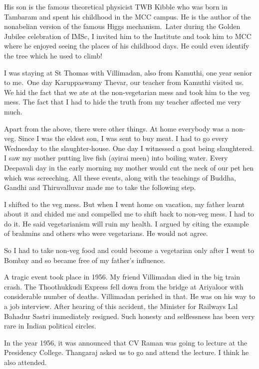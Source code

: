  
His son is the famous theoretical physicist TWB Kibble	who was born in 
Tambaram and spent his childhood in the MCC campus. He is the author of 
the nonabelian version of the famous Higgs mechanism.\ Later during the 
Golden Jubilee celebration of IMSc, I invited him to the Institute and 
took him to MCC where he enjoyed seeing the places of his childhood 
days. He could even identify the tree which he used to climb!

  
I was staying at St Thomas with Villimadan, also from Kamuthi, one year 
senior to me.\ One day Karuppaswamy Thevar, our teacher from Kamuthi 
visited us. We hid the fact that we ate at the non-vegetarian mess and 
took him to the veg mess. The fact that I had to hide the truth from my 
teacher affect\-ed me very much.


Apart from the above, there were other things. At home every\-body was a 
non-veg. Since I was the eldest son, I was sent to buy meat. I had to go 
every Wednesday to the slaughter-house. One day I witnessed a goat being 
slaughtered. I saw my mother putting live fish (ayirai meen) into 
boiling water. Every Deepa\-vali day in the early morning my mother would 
cut the neck of our pet hen which was screeching. All these events, 
along with the teachings of Buddha, Gandhi and Thiruvalluvar made me to 
take the following step.

\vskip 1pt
I shifted to the veg mess. But when I went home on vacation, my father 
learnt about it and chided me and compelled me to shift back to non-veg 
mess. I had to do it. He said vegetarianism will ruin my health. I 
argued by citing the example of brahmins and others who were 
vegetarians. He would not agree.


So I had to take non-veg food and could become a vegetarian only after I 
went to Bombay and so became free of my father's influence.

 
A tragic event took place in 1956. My friend Villimadan died in the big 
train crash. The Thoothukkudi Express fell down from the bridge at 
Ariyaloor with considerable number of deaths. Vi\-llimadan perished in 
that. He was on his way to a job interview. After hearing of this 
accident, the Minister for Railways Lal Bahadur Sastri immediately 
resigned. Such honesty and selflessness has been very rare in Indian 
political circles.


In the year 1956, it was announced that CV Raman was going to lecture at 
the Presidency College. Thangaraj asked us to go and attend the lecture. 
I think he also attended.


